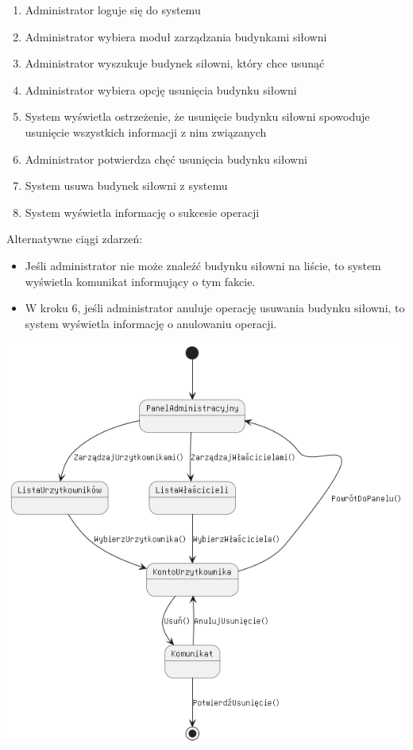 \documentclass[
]{article}
\providecommand{\tightlist}{%
  \setlength{\itemsep}{0pt}\setlength{\parskip}{0pt}}
\begin{document}
\begin{enumerate}
\tightlist
\item
  {Administrator loguje się do systemu}
\item
  {Administrator wybiera moduł zarządzania budynkami siłowni}
\item
  {Administrator wyszukuje budynek siłowni, który chce usunąć}
\item
  {Administrator wybiera opcję usunięcia budynku siłowni}
\item
  {System wyświetla ostrzeżenie, że usunięcie budynku siłowni spowoduje
  usunięcie wszystkich informacji z nim związanych}
\item
  {Administrator potwierdza chęć usunięcia budynku siłowni}
\item
  {System usuwa budynek siłowni z systemu}
\item
  {System wyświetla informację o sukcesie operacji}
\end{enumerate}

{Alternatywne ciągi zdarzeń:}

\begin{itemize}
\tightlist
\item
  {Jeśli administrator nie może znaleźć budynku siłowni na liście, to
  system wyświetla komunikat informujący o tym fakcie. }
\item
  {W kroku 6, jeśli administrator anuluje operację usuwania budynku
  siłowni, to system wyświetla informację o anulowaniu operacji.}
\end{itemize}

{}

{\includegraphics{diagrams/state/usuń_użytkownika.png}}
\end{document}
